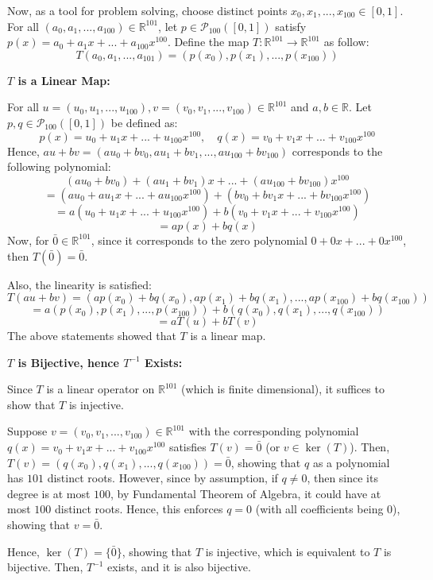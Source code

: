 \documentclass{article}
\begin{document}
\begin{itemize}
    Now, as a tool for problem solving, choose distinct points $x_0,x_1,...,x_{100}\in [0,1]$. For all $(a_0,a_1,...,a_{100})\in\mathbb{R}^{101}$, let $p\in\mathcal{P}_{100}([0,1])$ satisfy $p(x)=a_0+a_1x+...+a_{100}x^{100}$.
    Define the map $T:\mathbb{R}^{101}\rightarrow\mathbb{R}^{101}$ as follow:
    $$T(a_0,a_1,...,a_{101})= (p(x_0),p(x_1),...,p(x_{100}))$$

    \hfill

    \textbf{$T$ is a Linear Map:}

    For all $u=(u_0,u_1,...,u_{100}),v=(v_0,v_1,...,v_{100})\in\mathbb{R}^{101}$ and $a,b\in\mathbb{R}$. Let $p,q\in\mathcal{P}_{100}([0,1])$ be defined as:
    $$p(x)=u_0+u_1x+...+u_{100}x^{100},\quad q(x)=v_0+v_1x+...+v_{100}x^{100}$$
    Hence, $au+bv = (au_0+bv_0,au_1+bv_1,...,au_{100}+bv_{100})$ corresponds to the following polynomial:
    $$(au_0+bv_0)+(au_1+bv_1)x+...+(au_{100}+bv_{100})x^{100}$$
    $$=(au_0+au_1x+...+au_{100}x^{100})+(bv_0+bv_1x+...+bv_{100}x^{100})$$
    $$=a(u_0+u_1x+...+u_{100}x^{100})+b(v_0+v_1x+...+v_{100}x^{100})$$
    $$=ap(x)+bq(x)$$
    Now, for $\bar{0}\in\mathbb{R}^{101}$, since it corresponds to the zero polynomial $0+0x+...+0x^{100}$, then $T(\bar{0})=\bar{0}$.

    Also, the linearity is satisfied:
    $$T(au+bv) = (ap(x_0)+bq(x_0),ap(x_1)+bq(x_1),...,ap(x_{100})+bq(x_{100}))$$
    $$=a(p(x_0),p(x_1),...,p(x_{100}))+b(q(x_0),q(x_1),...,q(x_{100}))$$
    $$ = aT(u)+bT(v)$$
    The above statements showed that $T$ is a linear map.

    \hfill
    
    \textbf{$T$ is Bijective, hence $T^{-1}$ Exists:}

    Since $T$ is a linear operator on $\mathbb{R}^{101}$ (which is finite dimensional), it suffices to show that $T$ is injective.

    Suppose $v=(v_0,v_1,...,v_{100})\in\mathbb{R}^{101}$ with the corresponding polynomial $q(x)=v_0+v_1x+...+v_{100}x^{100}$ satisfies $T(v)=\bar{0}$ (or $v\in \ker(T)$).
    Then, $T(v)=(q(x_0),q(x_1),...,q(x_{100}))=\bar{0}$, showing that $q$ as a polynomial has $101$ distinct roots. However, since by assumption, if $q\neq 0$, then since its degree is at most $100$,
    by Fundamental Theorem of Algebra, it could have at most $100$ distinct roots. Hence, this enforces $q=0$ (with all coefficients being $0$), showing that $v=\bar{0}$.

    Hence, $\ker(T)=\{\bar{0}\}$, showing that $T$ is injective, which is equivalent to $T$ is bijective. Then, $T^{-1}$ exists, and it is also bijective.


\end{itemize}
\end{document}
